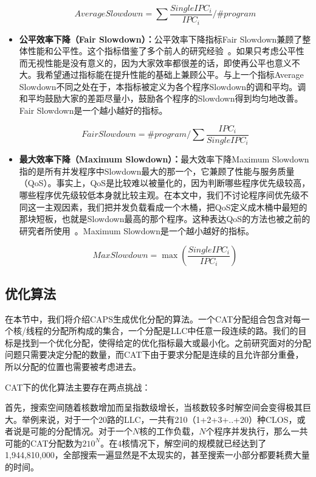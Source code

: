 \begin{itemize}
\begin{equation}
	AverageSlowdown = \sum\frac{SingleIPC_i}{IPC_i} / \#program
\end{equation}

\item \textbf{公平效率下降（Fair Slowdown）：}公平效率下降指标Fair Slowdown兼顾了整体性能和公平性。这个指标借鉴了多个前人的研究经验~\parencite{luo2001balancing, chang2014cooperative}。如果只考虑公平性而无视性能是没有意义的，因为大家效率都很差的话，即使再公平也意义不大。我希望通过指标能在提升性能的基础上兼顾公平。与上一个指标Average Slowdown不同之处在于，本指标被定义为各个程序Slowdown的调和平均。调和平均鼓励大家的差距尽量小，鼓励各个程序的Slowdown得到均匀地改善。Fair Slowdown是一个越小越好的指标。

\begin{equation}
	FairSlowdown = \#program / {\sum\frac{IPC_i}{SingleIPC_i}}
\end{equation}

\item \textbf{最大效率下降（Maximum Slowdown）：}最大效率下降Maximum Slowdown指的是所有并发程序中Slowdown最大的那一个，它兼顾了性能与服务质量（QoS）。事实上，QoS是比较难以被量化的，因为判断哪些程序优先级较高，哪些程序优先级较低本身就比较主观。在本文中，我们不讨论程序间优先级不同这一主观因素，我们把并发负载看成一个木桶，把QoS定义成木桶中最短的那块短板，也就是Slowdown最高的那个程序。这种表达QoS的方法也被之前的研究者所使用~\parencite{manikantan2012probabilistic}。Maximum Slowdown是一个越小越好的指标。

\begin{equation}
MaxSlowdown=\max(\frac{SingleIPC_i}{IPC_i})
\label{eq:qos}
\end{equation}

\end{itemize}

\subsection{优化算法}

在本节中，我们将介绍CAPS生成优化分配的算法。一个CAT分配组合包含对每一个核/线程的分配所构成的集合，一个分配是LLC中任意一段连续的路。我们的目标是找到一个优化分配，使得给定的优化指标最大或最小化。之前研究面对的分配问题只需要决定分配的数量，而CAT下由于要求分配是连续的且允许部分重叠，所以分配的位置也需要被考虑进去。

CAT下的优化算法主要存在两点挑战：

首先，搜索空间随着核数增加而呈指数级增长，当核数较多时解空间会变得极其巨大。举例来说，对于一个20路的LLC，一共有210（1+2+3+..+20）种CLOS，或者说是可能的分配情况。对于一个$N$核的工作负载，$N$个程序并发执行，那么一共可能的CAT分配数为$210^N$。在4核情况下，解空间的规模就已经达到了1,944,810,000，全部搜索一遍显然是不太现实的，甚至搜索一小部分都要耗费大量的时间。

